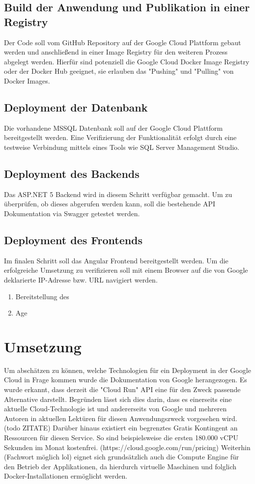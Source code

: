 \documentclass[pdftex,a4paper,abstracton,11pt,parskip=half,bibtotocnumbered]{scrartcl}
\begin{document}
	\subsection{Build der Anwendung und Publikation in einer Registry}
	Der Code soll vom GitHub Repository auf der Google Cloud Plattform gebaut werden und anschließend in einer Image Registry für den weiteren Prozess
	abgelegt werden. Hierfür sind potenziell die Google Cloud Docker Image Registry oder der Docker Hub geeignet, sie erlauben das "Pushing" und "Pulling"
	von Docker Images. 

	\subsection{Deployment der Datenbank}
	Die vorhandene MSSQL Datenbank soll auf der Google Cloud Plattform bereitgestellt werden. Eine Verifizierung der Funktionalität erfolgt durch 
	eine testweise Verbindung mittels eines Tools wie SQL Server Management Studio. 

	\subsection{Deployment des Backends}
	Das ASP.NET 5 Backend wird in diesem Schritt verfügbar gemacht. Um zu überprüfen, ob dieses abgerufen werden kann, soll die bestehende API 
	Dokumentation via Swagger getestet werden. 
	
	\subsection{Deployment des Frontends}
	Im finalen Schritt soll das Angular Frontend bereitgestellt werden. Um die erfolgreiche Umsetzung zu verifizieren soll mit einem Browser auf
	die von Google deklarierte IP-Adresse bzw. URL navigiert werden.


\begin{enumerate}
	\item Bereitstellung des  
	\item Age
\end{enumerate}

\section{Umsetzung}
	Um abschätzen zu können, welche Technologien für ein Deployment in der Google Cloud in Frage kommen wurde die Dokumentation von Google herangezogen.
	Es wurde erkannt, dass derzeit die "Cloud Run" API eine für den Zweck passende Alternative darstellt. Begründen lässt sich dies darin, dass es einerseits 
	eine aktuelle Cloud-Technologie ist und andererseits von Google und mehreren Autoren in aktuellen Lektüren für diesen Anwendungszweck vorgesehen wird.(todo ZITATE)
	Darüber hinaus existiert ein begrenztes Gratis Kontingent an Ressourcen für diesen Service. So sind beispielsweise die ersten 180.000 vCPU Sekunden 
	im Monat kostenfrei. (https://cloud.google.com/run/pricing)
	Weiterhin (Fachwort möglich lol) eignet sich grundsätzlich auch die Compute Engine für den Betrieb der Applikationen, da hierdurch virtuelle Maschinen
	und folglich Docker-Installationen ermöglicht werden.
\end{document}
